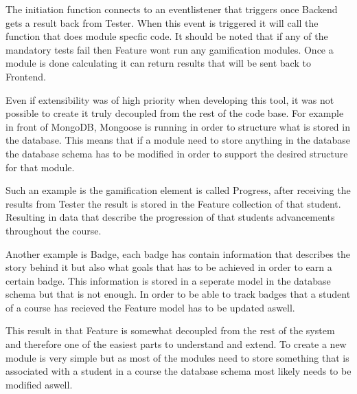 The initiation function connects to an eventlistener that triggers once Backend
gets a result back from Tester. When this event is triggered it will call the
function that does module specfic code. It should be noted that if any of the
mandatory tests fail then Feature wont run any gamification modules. Once a module
is done calculating it can return results that will be sent back to Frontend.

Even if extensibility was of high priority when developing this tool, it was not
possible to create it truly decoupled from the rest of the code base. For example
in front of MongoDB, Mongoose is running in order to structure what is stored in
the database. This means that if a module need to store anything in the database
the database schema has to be modified in order to support the desired structure
for that module.

Such an example is the gamification element is called Progress, after
receiving the results from Tester the result is stored in the Feature collection
of that student. Resulting in data that describe the progression of that students
advancements throughout the course.

Another example is Badge, each badge has contain information that describes the
story behind it but also what goals that has to be achieved in order to earn a
certain badge. This information is stored in a seperate model in the database
schema but that is not enough. In order to be able to track badges that a student
of a course has recieved the Feature model has to be updated aswell.

This result in that Feature is somewhat decoupled from the rest of the system and
therefore one of the easiest parts to understand and extend. To create a new module
is very simple but as most of the modules need to store something that is associated
with a student in a course the database schema most likely needs to be modified aswell.
